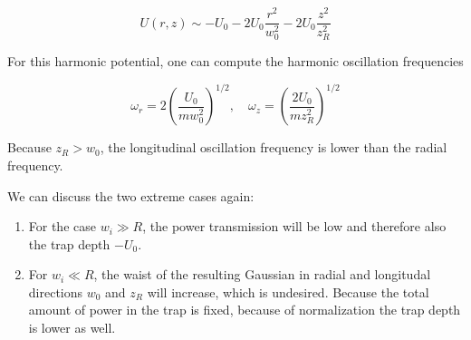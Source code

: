 \begin{equation}\label{eq:ApproximateGaussianPotential}
    U(r,z) \sim -U_0 - 2U_0 \frac{r^2}{w_0^2} - 2U_0 \frac{z^2}{z_R^2}
\end{equation}

For this harmonic potential, one can compute the harmonic oscillation frequencies 

\begin{equation}
    \omega_r = 2\left(\frac{U_0}{m w_0^2}\right)^{1/2}, \quad
    \omega_z= \left(\frac{2 U_0}{m z_R^2}\right)^{1/2}
\end{equation}

Because $z_R > w_0$, the longitudinal oscillation frequency is lower than the radial frequency.




%         





We can discuss the two extreme cases again:

\begin{enumerate}
    \item For the case $w_i \gg R$, the power transmission will be low and therefore also the trap depth $-U_0$.
    \item For $w_i \ll R$, the waist of the resulting Gaussian in radial and longitudal directions $w_0$ and $z_R$ will increase, which is undesired. Because the total amount of power in the trap is fixed, because of normalization the trap depth is lower as well. 
\end{enumerate}





